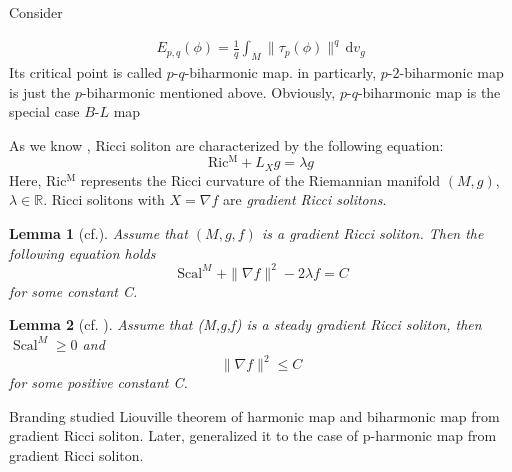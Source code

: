 \documentclass[12pt,UTF8]{article}
\theoremstyle{plain}
\newtheorem{lem}{Lemma}
\theoremstyle{definition}
\def\d {\mathrm{d}}
\def\na{\ensuremath{\nabla}}
\def\R{{\Bbb R}}
\renewcommand{\d}[1]{\mathbb{#1}}
\renewcommand{\(}{\left(}
\renewcommand{\)}{\right)}
\renewcommand{\leq}{\leqslant}
\renewcommand{\geq}{\geqslant}
\numberwithin{equation}{subsection}
\def\na{\nabla}
\renewcommand{\leq}{\leqslant}
\renewcommand{\geq}{\geqslant}
\renewcommand{\(}{\left(}
\renewcommand{\)}{\right)}
\def\d{\mathrm{d}}
\def\R{\mathbb{R}}
\def \d {\mathrm{d}}
\numberwithin{equation}{section}
\begin{document}
Consider 

	\begin{equation}
		\begin{split}
			E_{p,q}(\phi)= \frac{1}{q}	\int_M \|\tau_p(\phi)\|^q \,\d v_{g}
		\end{split}
	\end{equation}	
Its critical point is called  $p$-$q$-biharmonic map. in particarly, $p$-$2$-biharmonic map is just the $p$-biharmonic mentioned above. 	Obviously, $p$-$q$-biharmonic map is the special case  $B$-$L$ map
	

	As we know , Ricci soliton are characterized by the following equation: 
	\begin{equation}
		\label{eq:soliton}
		\operatorname{Ric^M}+L_Xg=\lambda g
	\end{equation}
	Here, $\operatorname{Ric^M}$ represents the Ricci curvature of the Riemannian 
	manifold $(M,g)$,  $ \lambda\in\R$. 	Ricci solitons  with $X=\na f $ are  \emph{gradient Ricci solitons}.
	
	\begin{lem}[cf.\cite{MR2448435}]\label{17}
		Assume that $(M,g,f)$ is a gradient Ricci soliton.
		Then the following equation holds
		\begin{equation}
			\label{identity-soliton-const}
			\operatorname{Scal}^M+\|\nabla f\|^2-2\lambda f=C
		\end{equation}
		for some constant C.
	\end{lem}
	
	
	\begin{lem}[cf. \cite{MR2448435}]\label{16}
		\label{lem:bound-nabla-f}
		Assume that (M,g,f) is a steady gradient Ricci soliton, then
		$	\operatorname{Scal}^M\geq 0 $ and 
		\begin{equation}
			\label{eq:steady-bound-f}
			\|\nabla f\|^2\leq C
		\end{equation}
		for some positive constant C.
	\end{lem}
	
	Branding \cite{MR4674270} studied Liouville theorem of harmonic map and biharmonic map from gradient Ricci soliton. Later, \cite{MR4993852} generalized it to the case of p-harmonic map from gradient Ricci soliton.
	
\end{document}

